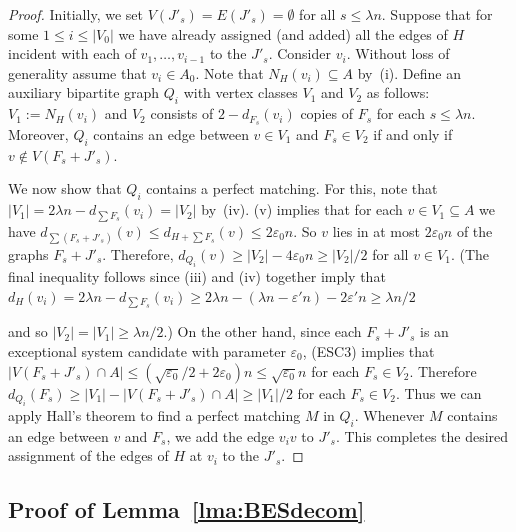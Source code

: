 \documentclass{memo-l}
\def\COMMENT#1{}
\def\eps{\varepsilon}
\def\epszero{\eps_0}
\numberwithin{section}{chapter}
\numberwithin{equation}{section}
\numberwithin{firstthm}{section}
\numberwithin{figure}{section}
\begin{document}
{\begin{proof}
Initially, we set $V(J'_s)=E(J'_s) = \emptyset$ for all $s \le \lambda n$.
Suppose that for some $1\le i\le |V_0|$ we have already assigned (and added) all the edges of $H$
incident with each of $v_1, \dots, v_{i-1}$ to the $J'_s$.
Consider $v_i$. Without loss of generality assume that $v_i \in A_0$. Note that $N_H(v_i)\subseteq A$ by~(i).
Define an auxiliary bipartite graph $Q_i$ with vertex classes $V_1$ and $V_2$ as follows:
$V_1:=N_{H} (v_i)$ and $V_2$ consists of $2-d_{F_s}(v_i)$ copies of $F_s$ for each $ s\le \lambda n $. 
Moreover, $Q_i$ contains an edge between $v \in V_1$ and $F_s \in V_2$ if and only if $v\notin V(F_s + J'_s)$.%
    \COMMENT{We can write this in this way since by def an exceptional system candidate does not contain
isolated vertices in $A\cup B$. If we change the def, then we here have to write that $v$ is not incident to an
edge of $F_s$.}

We now show that $Q_i$ contains a perfect matching. For this, 
note that $|V_1|=2\lambda n - d_{\sum F_s} (v_i)= |V_2|$ by~(iv). 
(v) implies that for each $v \in V_1 \subseteq A$ we have  $d_{\sum (F_s+J'_s)}(v) \le d_{H+\sum F_s}(v) \le 2 \epszero n$.
So $v$ lies in at most $2 \epszero n$ of the graphs $F_s+J'_s$.
Therefore, $d_{Q_i} (v) \geq |V_2| -4 \eps _0n \geq |V_2|/2$ for all $v \in V_1$. (The final
inequality follows since (iii) and (iv) together imply that
$d_H(v_i)=2\lambda n-d_{\sum F_s} (v_i)\ge 2\lambda n -(\lambda n-\eps' n)-2\eps' n\ge \lambda n/2$%
    \COMMENT{The $2\eps' n$ comes from the fact that $d_{F_s}(v_i)\le 2$ for every exceptional system candidate $F_s$.} 
and so $|V_2|=|V_1|\geq \lambda n/2$.)
On the other hand, since each $F_s+J'_s$ is an exceptional system candidate with parameter $\eps_0$, (ESC3) implies that
$|V(F_s+J'_s)\cap A| \le (\sqrt{\epszero}/2  +2 \epszero) n \le \sqrt{\epszero} n$ for each $F_s \in V_2$.
Therefore $d_{Q_i} (F_s) \geq |V_1| -|V(F_s+J'_s)\cap A| \geq |V_1|/2$ for each $F_s\in V_2$.
Thus we can apply Hall's theorem to find a perfect matching $M$ in $Q_i$.
Whenever $M$ contains an edge between $v$ and $F_s$, we add the edge $v_iv$ to $J'_s$.
This completes the desired assignment of the edges of $H$ at $v_i$ to the $J'_s$.
\end{proof}



\subsection{Proof of Lemma~\ref{lma:BESdecom}}

}
\end{document}
